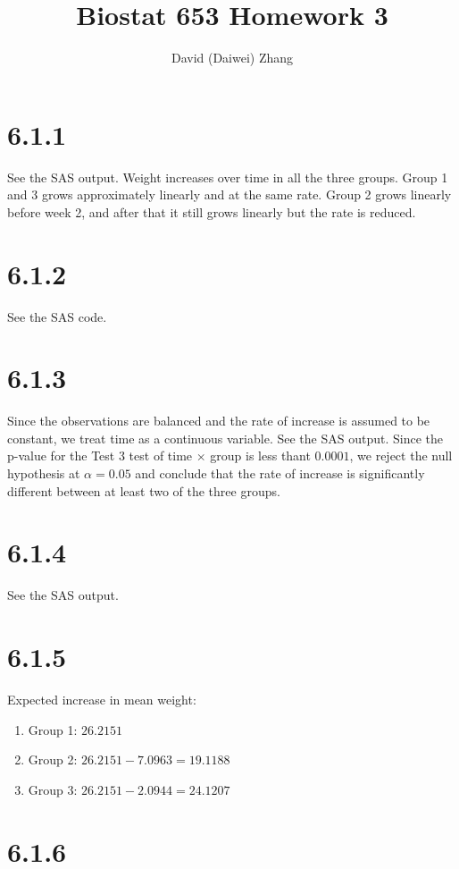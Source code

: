 \documentclass{article}[12pt]
\title{Biostat 653 Homework 3}
\author{David (Daiwei) Zhang}
\begin{document}
\maketitle

\section{6.1.1}

See the SAS output.
Weight increases over time in all the three groups.
Group 1 and 3 grows approximately linearly and at the same rate.
Group 2 grows linearly before week 2, and after that it still grows linearly but the rate is reduced.

\section{6.1.2}

See the SAS code.

\section{6.1.3}

Since the observations are balanced and the rate of increase is assumed to be constant,
we treat time as a continuous variable.
See the SAS output.
Since the p-value for the Test 3 test of time $\times$ group is less thant $0.0001$, we reject the null hypothesis at $\alpha = 0.05$ and conclude that the rate of increase is significantly different between at least two of the three groups.

\section{6.1.4}

See the SAS output.

\section{6.1.5}
Expected increase in mean weight:
\begin{enumerate}
\item Group 1: $26.2151$
\item Group 2: $26.2151 - 7.0963 = 19.1188$
\item Group 3: $26.2151 -2.0944 = 24.1207$
\end{enumerate}

\section{6.1.6}
\end{document}
